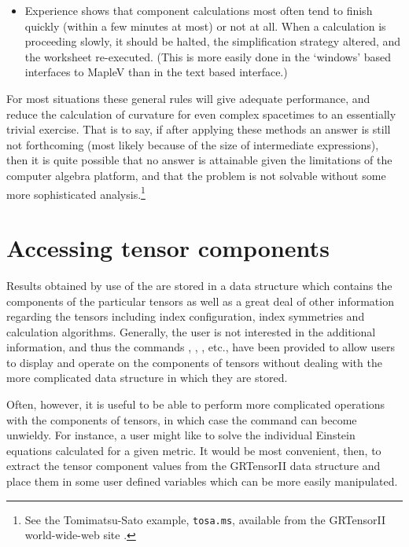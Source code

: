 \documentclass{article}
\begin{document}
{{{\begin{itemize}
    to substitute the explicit forms of the functions \textsl{after} a
    more general calculation is completed. For both coordinate and
    tetrad calculations the removal of trigonometric and like
    functions via elementary transformations (such as $u(\theta) :=
    \cos\theta$) will often improve performance.
%
  \item Experience shows that component calculations most often tend
    to finish quickly (within a few minutes at most) or not at
    all. When a calculation is proceeding slowly, it should be halted,
    the simplification strategy altered, and the worksheet
    re-executed. (This is more easily done in the `windows' based
    interfaces to MapleV than in the text based interface.)
\end{itemize}

For most situations these general rules will give adequate
performance, and reduce the calculation of curvature for even complex
spacetimes to an essentially trivial exercise. That is to say, if
after applying these methods an answer is still not forthcoming (most
likely because of the size of intermediate expressions), then it is
quite possible that no answer is attainable given the limitations of
the computer algebra platform, and that the problem is not solvable
without some more sophisticated analysis.\footnote{See the Tomimatsu-Sato
example, \texttt{tosa.ms}, available from the GRTensorII
world-wide-web site \cite{www}.}
%
\section{Accessing tensor components} \label{sec:grcomponent}
%
Results obtained by use of the  are stored in a data
structure which contains the components of the particular tensors as well
as a great deal of other information regarding the tensors including
index configuration, index symmetries and calculation algorithms. Generally,
the user is not interested in the additional information, and thus the
commands , , , etc., have
been provided to allow users to display and operate on the components of
tensors without dealing with the more complicated data structure in which
they are stored.

Often, however, it is useful to be able to perform more complicated
operations with the components of tensors, in which case the
 command can become unwieldy. For instance, a user might
like to solve the individual Einstein equations calculated for
a given metric. It would be most convenient, then, to extract the
tensor component values from the GRTensorII data structure and place them
in some user defined variables which can be more easily manipulated.

}}}
\end{document}
